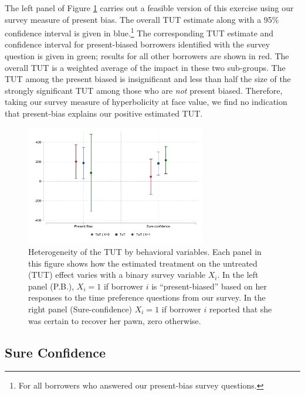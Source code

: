 \begin{appendix}
The left panel of Figure \ref{tut_beh_partition} carries out a feasible version of this exercise using our survey measure of present bias.
The overall TUT estimate along with a 95\% confidence interval is given in blue.\footnote{For all borrowers who answered our present-bias survey questions.}
The corresponding TUT estimate and confidence interval for present-biased borrowers identified with the survey question is given in green; results for all other borrowers are shown in red.
The overall TUT is a weighted average of the impact in these two sub-groups.  The TUT among the present biased is insignificant and less than half the size of the strongly significant TUT among those who are \textit{not} present biased. Therefore, taking our survey measure of hyperbolicity at face value, we find no indication that present-bias explains our positive estimated TUT. 



\begin{figure}
    \begin{center}
        \centering
        \includegraphics[width=0.7\textwidth]{Figuras/tut_beh_partition.pdf} 
    \end{center}
     \scriptsize  
\caption{Heterogeneity of the TUT by behavioral variables. Each panel in this figure shows how the estimated treatment on the untreated (TUT) effect varies with a binary survey variable $X_i$. In the left panel (P.B.), $X_i = 1$ if borrower $i$ is ``present-biased'' based on her responses to the time preference questions from our survey. In the right panel (Sure-confidence) $X_i = 1$ if  borrower $i$ reported that she was certain to recover her pawn, zero otherwise. }

    \label{tut_beh_partition}

\end{figure}
\subsection{Sure Confidence} \label{App_sureconfidence}


\end{appendix}
